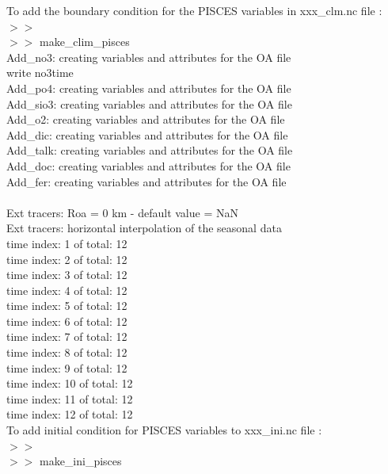 \noindent To add the boundary condition for the PISCES variables in xxx\_clm.nc file : \\
$>>$\\
$>>$ make\_clim\_pisces\\

Add\_no3: creating variables and attributes for the OA file\\
write no3time\\
Add\_po4: creating variables and attributes for the OA file\\
Add\_sio3: creating variables and attributes for the OA file\\
Add\_o2: creating variables and attributes for the OA file\\
Add\_dic: creating variables and attributes for the OA file\\
Add\_talk: creating variables and attributes for the OA file\\
Add\_doc: creating variables and attributes for the OA file\\
Add\_fer: creating variables and attributes for the OA file\\
 \\
 Ext tracers: Roa = 0 km - default value = NaN\\
 Ext tracers: horizontal interpolation of the seasonal data\\
time index: 1 of total: 12\\
time index: 2 of total: 12\\
time index: 3 of total: 12\\
time index: 4 of total: 12\\
time index: 5 of total: 12\\
time index: 6 of total: 12\\
time index: 7 of total: 12\\
time index: 8 of total: 12\\
time index: 9 of total: 12\\
time index: 10 of total: 12\\
time index: 11 of total: 12\\
time index: 12 of total: 12\\

\newpage
\noindent To add initial condition for PISCES variables to xxx\_ini.nc file : \\
$>>$\\
$>>$ make\_ini\_pisces\\

